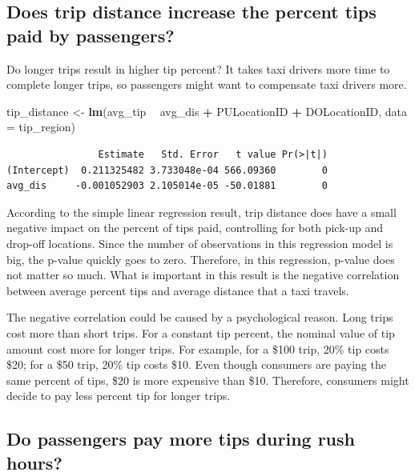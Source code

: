 \documentclass[12pt,twoside]{reedthesis}
\newenvironment{Shaded}{\begin{snugshade}}{\end{snugshade}}
\newcommand{\KeywordTok}[1]{\textcolor[rgb]{0.13,0.29,0.53}{\textbf{#1}}}
\newcommand{\DataTypeTok}[1]{\textcolor[rgb]{0.13,0.29,0.53}{#1}}
\newcommand{\StringTok}[1]{\textcolor[rgb]{0.31,0.60,0.02}{#1}}
\newcommand{\OperatorTok}[1]{\textcolor[rgb]{0.81,0.36,0.00}{\textbf{#1}}}
\newcommand{\NormalTok}[1]{#1}
\theoremstyle{definition}
\theoremstyle{definition}
\theoremstyle{definition}
\theoremstyle{remark}
\begin{document}
\subsection{Does trip distance increase the percent tips paid by
passengers?}\label{does-trip-distance-increase-the-percent-tips-paid-by-passengers}

Do longer trips result in higher tip percent? It takes taxi drivers more
time to complete longer trips, so passengers might want to compensate
taxi drivers more.
\begin{Shaded}
\begin{Highlighting}[]
\NormalTok{tip_distance <-}\StringTok{ }\KeywordTok{lm}\NormalTok{(avg_tip }\OperatorTok{~}\StringTok{ }\NormalTok{avg_dis }\OperatorTok{+}\StringTok{ }\NormalTok{PULocationID }\OperatorTok{+}\StringTok{ }\NormalTok{DOLocationID, }\DataTypeTok{data =}\NormalTok{ tip_region)}
\end{Highlighting}
\end{Shaded}
\begin{verbatim}
                Estimate   Std. Error   t value Pr(>|t|)
(Intercept)  0.211325482 3.733048e-04 566.09360        0
avg_dis     -0.001052903 2.105014e-05 -50.01881        0
\end{verbatim}
According to the simple linear regression result, trip distance does
have a small negative impact on the percent of tips paid, controlling
for both pick-up and drop-off locations. Since the number of
observations in this regression model is big, the p-value quickly goes
to zero. Therefore, in this regression, p-value does not matter so much.
What is important in this result is the negative correlation between
average percent tips and average distance that a taxi travels.

The negative correlation could be caused by a psychological reason. Long
trips cost more than short trips. For a constant tip percent, the
nominal value of tip amount cost more for longer trips. For example, for
a \$100 trip, 20\% tip costs \$20; for a \$50 trip, 20\% tip costs \$10.
Even though consumers are paying the same percent of tips, \$20 is more
expensive than \$10. Therefore, consumers might decide to pay less
percent tip for longer trips.

\subsection{Do passengers pay more tips during rush
hours?}\label{do-passengers-pay-more-tips-during-rush-hours}
\end{document}
